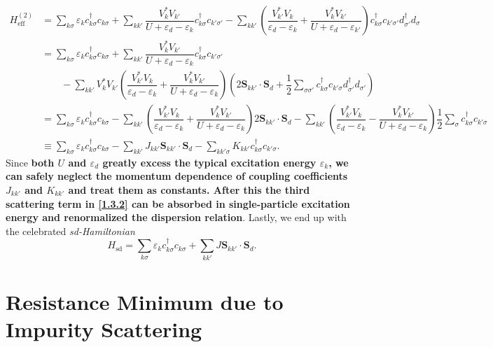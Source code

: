 \documentclass[aps,prx,superscriptaddress,onecolumn,preprintnumbers,nofootinbib,longbibliography]{revtex4-1}
\begin{document}
		\begin{align}
			H_{\text{eff}}^{(2)}&=\sum_{k \sigma}\varepsilon_k c_{k \sigma}^\dagger c_{k \sigma}+\sum_{kk'}\dfrac{V_k^*V_{k'}}{U+\varepsilon_d- \varepsilon_k}c_{k \sigma}^\dagger c_{k' \sigma'}-\sum_{kk'}\left(\dfrac{V_{k'}^*V_k}{\varepsilon_d- \varepsilon_k}+\dfrac{V_k^*V_{k'}}{U+\varepsilon_d- \varepsilon_{k'}}\right)c_{k \sigma}^\dagger c_{k'\sigma'}d_{\sigma'}^\dagger d_\sigma\nonumber\\
			&=\sum_{k \sigma}\varepsilon_k c_{k \sigma}^\dagger c_{k \sigma}+\sum_{kk'}\dfrac{V_k^*V_{k'}}{U+\varepsilon_d- \varepsilon_k}c_{k \sigma}^\dagger c_{k' \sigma'}\nonumber\\
			&\qquad-\sum_{kk'}V_k^*V_{k'}\left(\dfrac{V_{k'}^*V_k}{\varepsilon_d- \varepsilon_k}+\dfrac{V_k^*V_{k'}}{U+\varepsilon_d- \varepsilon_k}\right)\left(2\bm{S}_{kk'}\cdot\bm{S}_d+\dfrac{1}{2}\sum_{\sigma\sigma'}c_{k\sigma}^\dagger c_{k'\sigma}d_{\sigma'}^\dagger d_{\sigma'}\right)\nonumber\\
			&=\sum_{k \sigma}\varepsilon_k c_{k \sigma}^\dagger c_{k \sigma}-\sum_{kk'}\left(\dfrac{V_{k'}^*V_k}{\varepsilon_d- \varepsilon_k}+\dfrac{V_k^*V_{k'}}{U+\varepsilon_d- \varepsilon_k}\right)2\bm{S}_{kk'}\cdot\bm{S}_d-\sum_{kk'}\left(\dfrac{V_{k'}^*V_k}{\varepsilon_d- \varepsilon_k}-\dfrac{V_k^*V_{k'}}{U+\varepsilon_d- \varepsilon_k}\right)\dfrac{1}{2}\sum_{\sigma}c_{k \sigma}^\dagger c_{k' \sigma}\nonumber\\
			&\equiv\sum_{k \sigma}\varepsilon_k c_{k \sigma}^\dagger c_{k \sigma}-\sum_{kk'}J_{kk'}\bm{S}_{kk'}\cdot\bm{S}_d-\sum_{kk' \sigma}K_{kk'}c_{k \sigma}^\dagger c_{k'\sigma}.\label{1.3.2}
		\end{align}
		Since \textbf{both $U$ and $\varepsilon_d$ greatly excess the typical excitation energy $\varepsilon_k$, we can safely neglect the momentum dependence of coupling coefficients $J_{kk'}$ and $K_{kk'}$ and treat them as constants. After this the third scattering term in \eqref{1.3.2} can be absorbed in single-particle excitation energy and renormalized the dispersion relation}. Lastly, we end up with the celebrated \emph{sd-Hamiltonian}
		\begin{equation}\label{1.3.3}
			\boxed{H_{\text{sd}}=\sum_{k \sigma}\varepsilon_k c_{k \sigma}^\dagger c_{k \sigma}+\sum_{kk'}J\bm{S}_{kk'}\cdot\bm{S}_d}.
		\end{equation}

\section{Resistance Minimum due to Impurity Scattering}
\end{document}
